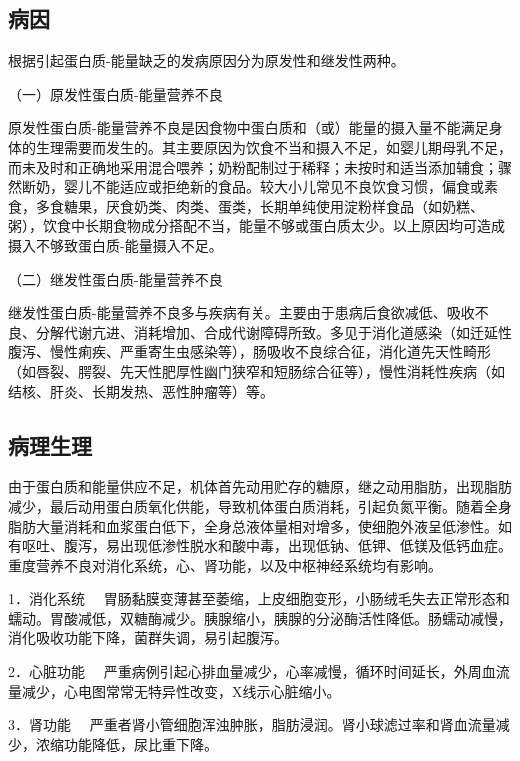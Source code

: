 \hypertarget{text00003.htmlux5cux23mllj10}{%
\subsection{病因}\label{text00003.htmlux5cux23mllj10}}

根据引起蛋白质-能量缺乏的发病原因分为原发性和继发性两种。

（一）原发性蛋白质-能量营养不良

原发性蛋白质-能量营养不良是因食物中蛋白质和（或）能量的摄入量不能满足身体的生理需要而发生的。其主要原因为饮食不当和摄入不足，如婴儿期母乳不足，而未及时和正确地采用混合喂养；奶粉配制过于稀释；未按时和适当添加辅食；骤然断奶，婴儿不能适应或拒绝新的食品。较大小儿常见不良饮食习惯，偏食或素食，多食糖果，厌食奶类、肉类、蛋类，长期单纯使用淀粉样食品（如奶糕、粥），饮食中长期食物成分搭配不当，能量不够或蛋白质太少。以上原因均可造成摄入不够致蛋白质-能量摄入不足。

（二）继发性蛋白质-能量营养不良

继发性蛋白质-能量营养不良多与疾病有关。主要由于患病后食欲减低、吸收不良、分解代谢亢进、消耗增加、合成代谢障碍所致。多见于消化道感染（如迁延性腹泻、慢性痢疾、严重寄生虫感染等），肠吸收不良综合征，消化道先天性畸形（如唇裂、腭裂、先天性肥厚性幽门狭窄和短肠综合征等），慢性消耗性疾病（如结核、肝炎、长期发热、恶性肿瘤等）等。

\hypertarget{text00003.htmlux5cux23mllj11}{%
\subsection{病理生理}\label{text00003.htmlux5cux23mllj11}}

由于蛋白质和能量供应不足，机体首先动用贮存的糖原，继之动用脂肪，出现脂肪减少，最后动用蛋白质氧化供能，导致机体蛋白质消耗，引起负氮平衡。随着全身脂肪大量消耗和血浆蛋白低下，全身总液体量相对增多，使细胞外液呈低渗性。如有呕吐、腹泻，易出现低渗性脱水和酸中毒，出现低钠、低钾、低镁及低钙血症。重度营养不良对消化系统，心、肾功能，以及中枢神经系统均有影响。

{1．消化系统}
　胃肠黏膜变薄甚至萎缩，上皮细胞变形，小肠绒毛失去正常形态和蠕动。胃酸减低，双糖酶减少。胰腺缩小，胰腺的分泌酶活性降低。肠蠕动减慢，消化吸收功能下降，菌群失调，易引起腹泻。

{2．心脏功能}
　严重病例引起心排血量减少，心率减慢，循环时间延长，外周血流量减少，心电图常常无特异性改变，X线示心脏缩小。

{3．肾功能}
　严重者肾小管细胞浑浊肿胀，脂肪浸润。肾小球滤过率和肾血流量减少，浓缩功能降低，尿比重下降。

